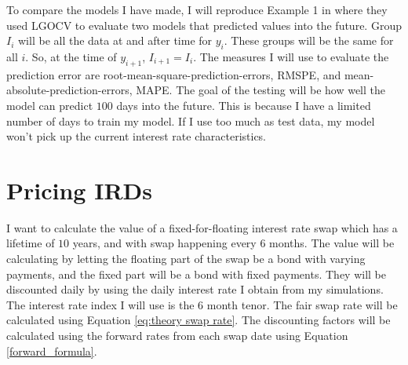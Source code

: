 \noindent To compare the models I have made, I will reproduce Example 1 in \cite[p.~5--8]{Adin_2024} where they used LGOCV to evaluate two models that predicted values into the future. Group $I_i$ will be all the data at and after time for $y_i$. These groups will be the same for all $i$. So, at the time of $y_{i+1}$, $I_{i+1} = I_i$. The measures I will use to evaluate the prediction error are root-mean-square-prediction-errors, RMSPE, and mean-absolute-prediction-errors, MAPE. The goal of the testing will be how well the model can predict $100$ days into the future. This is because I have a limited number of days to train my model. If I use too much as test data, my model won't pick up the current interest rate characteristics.



\section{Pricing IRDs}

\noindent I want to calculate the value of a fixed-for-floating interest rate swap which has a lifetime of $10$ years, and with swap happening every $6$ months. The value will be calculating by letting the floating part of the swap be a bond with varying payments, and the fixed part will be a bond with fixed payments. They will be discounted daily by using the daily interest rate I obtain from my simulations. The interest rate index I will use is the $6$ month tenor. The fair swap rate will be calculated using Equation \eqref{eq:theory swap rate}. The discounting factors will be calculated using the forward rates from each swap date using Equation \eqref{forward_formula}.
